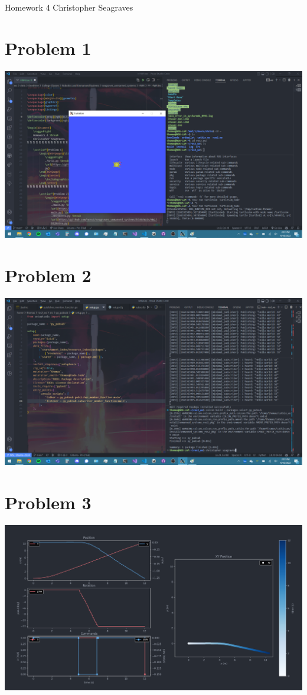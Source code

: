 \documentclass{article}
\begin{document}
    \raggedright
    Homework 4 \break
    Christopher Seagraves

    \section*{Problem 1}
        \includegraphics[width=\linewidth]{Problem 1 Turtlebot Simulator.png}

    \section*{Problem 2}
        \includegraphics[width=\linewidth]{Problem 2 Publisher and Subscriber.png}

    \section*{Problem 3}
        \includegraphics[width=\linewidth]{Problem 3 Telemetry.png}
\end{document}
